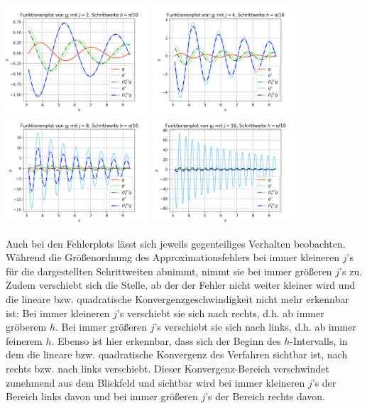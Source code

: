 \documentclass{scrartcl}
\begin{document}
{    \vspace{0.5cm}
    \includegraphics[width=0.4\textwidth]{Grafiken/Funktionenplot_j2_Pi_Zehntel}
    \includegraphics[width=0.4\textwidth]{Grafiken/Funktionenplot_j4_Pi_Zehntel}\\
    \includegraphics[width=0.4\textwidth]{Grafiken/Funktionenplot_j8_Pi_Zehntel}
    \includegraphics[width=0.4\textwidth]{Grafiken/Funktionenplot_j16_Pi_Zehntel}\\
    \vspace{-0.2cm}
    \vspace{0.5cm}
  }

Auch bei den Fehlerplots lässt sich jeweils gegenteiliges Verhalten beobachten. Während die Größenordnung des Approximationsfehlers bei immer kleineren $j$'s für die dargestellten Schrittweiten abnimmt, nimmt sie bei immer größeren $j$'s zu. Zudem verschiebt sich die Stelle, ab der der Fehler nicht weiter kleiner wird und die lineare bzw. quadratische Konvergenzgeschwindigkeit nicht mehr erkennbar ist: Bei immer kleineren $j$'s verschiebt sie sich nach rechts, d.h. ab immer gröberem $h$. Bei immer größeren $j$'s verschiebt sie sich nach links, d.h. ab immer feinerem $h$. Ebenso ist hier erkennbar, dass sich der Beginn des $h$-Intervalls, in dem die lineare bzw. quadratische Konvergenz des Verfahren sichtbar ist, nach rechts bzw. nach links verschiebt. Dieser Konvergenz-Bereich verschwindet zunehmend aus dem Blickfeld und sichtbar wird bei immer kleineren $j$'s der Bereich links davon und bei immer größeren $j$'s der Bereich rechts davon.
\end{document}
